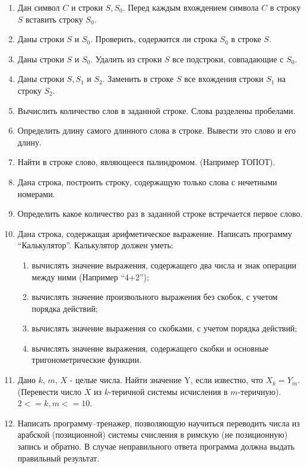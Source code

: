 \begin{enumerate}
  \item Дан символ $C$ и строки $S, S_0$. Перед каждым вхождением символа $C$ в строку $S$ вставить строку $S_0$.
  \item Даны строки $S$ и $S_0$. Проверить, содержится ли строка $S_0$ в строке $S$.
  \item Даны строки $S$ и $S_0$. Удалить из строки $S$ все подстроки, совпадающие с $S_0$.
  \item Даны строки $S, S_1$ и $S_2$. Заменить в строке $S$ все вхождения строки $S_1$ на строку $S_2$.
  \item Вычислить количество слов в заданной строке. Слова разделены пробелами.
  \item Определить длину самого длинного слова в строке. Вывести это слово и его длину.
  \item Найти в строке слово, являющееся палиндромом. (Например ТОПОТ).
  \item Дана строка, построить строку, содержащую только слова с нечетными номерами.
  \item Определить какое количество раз в заданной строке встречается первое слово.
  \item Дана строка, содержащая арифметическое выражение. Написать программу “Калькулятор”. Калькулятор должен уметь:
     \begin{enumerate}
       \item вычислять значение выражения, содержащего два числа и знак операции между ними (Например “4+2”);
       \item вычислять значение произвольного выражения без скобок, с учетом порядка действий;
       \item вычислять значение выражения со скобками, с учетом порядка действий;
       \item вычислять значение выражения, содержащего скобки и основные тригонометрические функции.
     \end{enumerate}
  \item Дано $k$, $m$, $X$ - целые числа. Найти значение Y, если известно, что $X_k=Y_m$. (Перевести число $X$  из $k$-теричной системы исчисления в $m$-теричную). $2<=k,m<=10$.
  \item Написать программу--тренажер, позволяющую научиться переводить числа из арабской (позиционной) системы счисления в римскую (не позиционную) запись и обратно. 
В случае неправильного ответа программа должна выдать правильный результат.

\end{enumerate}



